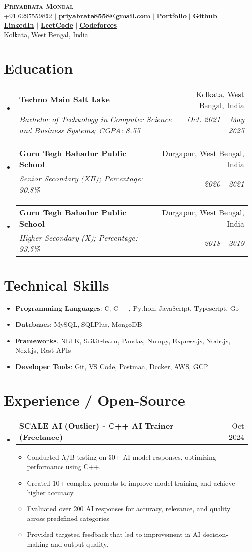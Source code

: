 \documentclass[letterpaper,11pt]{article}
\makeatletter
\newcommand{\resumeItem}[1]{
  \item\small{
    {#1 \vspace{-2pt}}
  }
}
\newcommand{\resumeSubheading}[4]{
  \vspace{2pt}\item
    \begin{tabular*}{0.97\textwidth}[t]{l@{\extracolsep{\fill}}r}
      \textbf{#1} & #2 \\
      \textit{\small#3} & \textit{\small #4} \\
    \end{tabular*}\vspace{-7pt}
}
\newcommand{\resumeProjectHeading}[2]{
    \item
    \begin{tabular*}{0.97\textwidth}{l@{\extracolsep{\fill}}r}
      \small#1 & #2 \\
    \end{tabular*}\vspace{-10pt} %
}
\newcommand{\resumeSubHeadingListStart}{\begin{itemize}[leftmargin=0.15in, label={}]}
\newcommand{\resumeSubHeadingListEnd}{\end{itemize}}
\newcommand{\resumeItemListStart}{\begin{itemize}}
\newcommand{\resumeItemListEnd}{\end{itemize}\vspace{-5pt}}
\makeatother
\begin{document}
\begin{center}
    \textbf{\Huge \scshape Priyabrata Mondal} \\
    \vspace{1pt}
    \small +91 6297559892 $|$ \href{mailto:priyabrata8558@gmail.com}{\textbf{priyabrata8558@gmail.com}} $|$ 
    \href{https://priyabratamondal.com}{\textbf{Portfolio}} $|$ 
    \href{https://github.com/PriyabrataMo}{\textbf{Github}} $|$ 
    \href{https://www.linkedin.com/in/priyabrata-mondal/}{\textbf{LinkedIn}} $|$
    \href{https://leetcode.com/prybruhta/}{\textbf{LeetCode}} $|$
    \href{https://codeforces.com/profile/priyabrata8558}{\textbf{Codeforces}} \\
    Kolkata, West Bengal, India
\end{center}

\section{Education}
  \resumeSubHeadingListStart
    \resumeSubheading
      {Techno Main Salt Lake}{Kolkata, West Bengal, India}
      {Bachelor of Technology in Computer Science and Business Systems; CGPA: 8.55}{Oct. 2021 -- May 2025}
    \resumeSubheading
      {Guru Tegh Bahadur Public School}{Durgapur, West Bengal, India}
      {Senior Secondary (XII); Percentage: 90.8\%}{2020 - 2021}
    \resumeSubheading
      {Guru Tegh Bahadur Public School}{Durgapur, West Bengal, India}
      {Higher Secondary (X); Percentage: 93.6\%}{2018 - 2019}
  \resumeSubHeadingListEnd

\section{Technical Skills}
\resumeSubHeadingListStart
    \resumeItemListStart
        \resumeItem{\textbf{Programming Languages}: C, C++, Python, JavaScript, Typescript, Go}
        \resumeItem{\textbf{Databases}: MySQL, SQLPlus, MongoDB}
        \resumeItem{\textbf{Frameworks}: NLTK, Scikit-learn, Pandas, Numpy, Express.js, Node.js, Next.js, Rest APIs}
        \resumeItem{\textbf{Developer Tools}: Git, VS Code, Postman, Docker, AWS, GCP}
    \resumeItemListEnd
\resumeSubHeadingListEnd

\section{Experience / Open-Source}
\resumeSubHeadingListStart
    \resumeProjectHeading
    {\textbf{SCALE AI (Outlier) - C++ AI Trainer (Freelance)}}{Oct 2024}
    \resumeItemListStart
        \resumeItem{Conducted A/B testing on 50+ AI model responses, optimizing performance using C++.}
        \resumeItem{Created 10+ complex prompts to improve model training and achieve higher accuracy.}
        \resumeItem{Evaluated over 200 AI responses for accuracy, relevance, and quality across predefined categories.}
        \resumeItem{Provided targeted feedback that led to improvement in AI decision-making and output quality.}
    \resumeItemListEnd
\resumeSubHeadingListEnd
\end{document}

